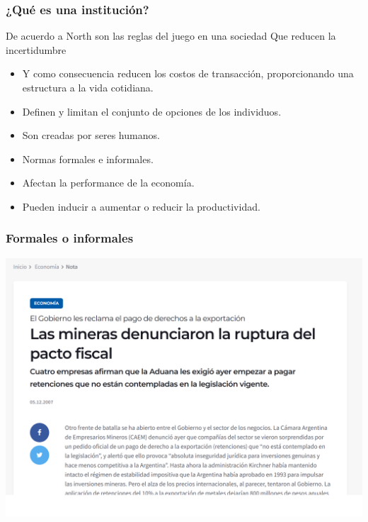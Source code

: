 \documentclass{beamer}
\begin{document}
\begin{frame}
\frametitle{¿Qué es una institución?}
De acuerdo a North  son las reglas del juego en una sociedad Que reducen la incertidumbre
  
 
    \begin{itemize}
        \item Y como consecuencia reducen los costos de transacción, proporcionando una estructura a la vida cotidiana.\vspace{2mm}
        \item Definen y limitan el conjunto de opciones de los individuos.\vspace{2mm}
        \item Son creadas por seres humanos.\vspace{2mm}
        \end{itemize}
        \begin{itemize}
        \item Normas formales e informales.\vspace{2mm}
        \item Afectan la performance de la economía.\vspace{2mm}
        \end{itemize}
        \begin{itemize}
        \item Pueden inducir a aumentar o reducir la productividad.
        \end{itemize} 
 
\end{frame}

\begin{frame}
\frametitle{Formales o informales}
\centering
\includegraphics[scale=0.4]{../Figures/Mina2.png}
\end{frame}
\end{document}
